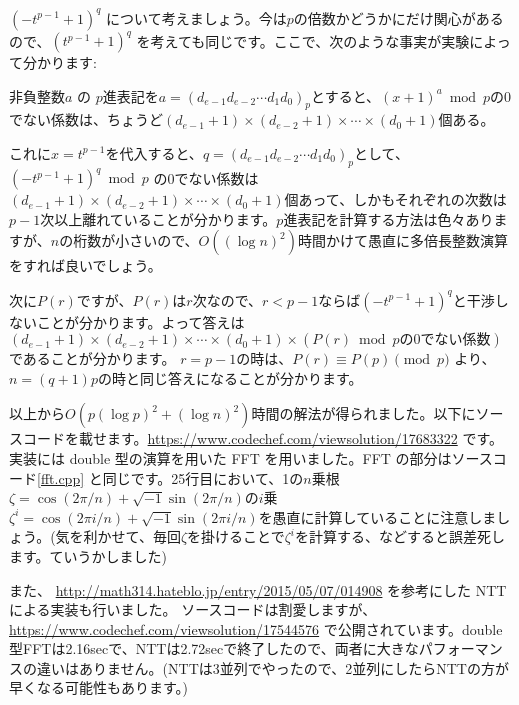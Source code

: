 \documentclass{jsarticle}
\begin{document}
  $(-t^{p-1}+1)^q$ について考えましょう。今は$p$の倍数かどうかにだけ関心があるので、$(t^{p-1}+1)^q$ を考えても同じです。ここで、次のような事実が実験によって分かります:
  \begin{center}
   非負整数$a$ の $p$進表記を$a = (d_{e-1}d_{e-2}\cdots d_1d_0)_p$とすると、$(x+1)^a \bmod p$の0でない係数は、ちょうど$(d_{e-1} + 1) \times (d_{e-2} + 1) \times \cdots \times (d_0 + 1)$個ある。
  \end{center}
  これに$x = t^{p-1}$を代入すると、$q = (d_{e-1}d_{e-2}\cdots d_1d_0)_p$として、
  $(-t^{p-1}+1)^q \bmod p$ の0でない係数は$(d_{e-1} + 1) \times (d_{e-2} + 1) \times \cdots \times (d_0 + 1)$個あって、しかもそれぞれの次数は$p-1$次以上離れていることが分かります。$p$進表記を計算する方法は色々ありますが、$n$の桁数が小さいので、$O((\log n)^2)$時間かけて愚直に多倍長整数演算をすれば良いでしょう。

  次に$P(r)$ですが、$P(r)$は$r$次なので、$r < p - 1$ならば$(-t^{p-1}+1)^q$と干渉しないことが分かります。よって答えは$(d_{e-1} + 1) \times (d_{e-2} + 1) \times \cdots \times (d_0 + 1) \times (P(r)\bmod p\mbox{の0でない係数})$であることが分かります。
  $r = p - 1$の時は、$P(r) \equiv P(p) \pmod p$ より、$n = (q + 1)p$の時と同じ答えになることが分かります。

  以上から$O(p(\log p)^2 + (\log n)^2)$時間の解法が得られました。以下にソースコードを載せます。\url{https://www.codechef.com/viewsolution/17683322} です。
  実装には double 型の演算を用いた FFT を用いました。FFT の部分はソースコード\ref{fft.cpp} と同じです。25行目において、1の$n$乗根$\zeta = \cos(2\pi/n) + \sqrt{-1}\sin(2\pi/n)$の$i$乗 $\zeta^i = \cos(2\pi i/n) + \sqrt{-1}\sin(2\pi i/n)$を愚直に計算していることに注意しましょう。(気を利かせて、毎回$\zeta$を掛けることで$\zeta^i$を計算する、などすると誤差死します。ていうかしました)
  

  また、 \url{http://math314.hateblo.jp/entry/2015/05/07/014908} を参考にした NTT による実装も行いました。
  ソースコードは割愛しますが、\url{https://www.codechef.com/viewsolution/17544576} で公開されています。double型FFTは2.16secで、NTTは2.72secで終了したので、両者に大きなパフォーマンスの違いはありません。(NTTは3並列でやったので、2並列にしたらNTTの方が早くなる可能性もあります。)
\end{document}
